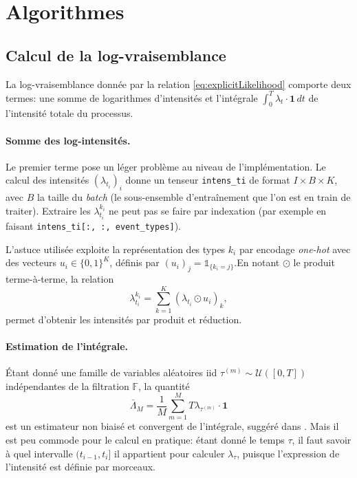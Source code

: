 \documentclass[../main.tex]{subfiles}
\begin{document}
\section{Algorithmes}\label{sec:algoAppendix}

\subsection{Calcul de la log-vraisemblance}

La log-vraisemblance donnée par la relation \eqref{eq:explicitLikelihood} comporte deux termes: une somme de logarithmes d'intensités et l'intégrale $\int_0^T\lambda_t\cdot\mathbf{1}\,dt$ de l'intensité totale du processus.

\paragraph{Somme des log-intensités.} Le premier terme pose un léger problème au niveau de l'implémentation. Le calcul des intensités ${(\lambda_{t_i})}_i$ donne un tenseur \verb|intens_ti| de format $I\times B\times K$, avec $B$ la taille du \textit{batch} (le sous-ensemble d'entraînement que l'on est en train de traiter). Extraire les $\lambda^{k_i}_{t_i}$ ne peut pas se faire par indexation (par exemple en faisant \verb|intens_ti[:, :, event_types]|).

L'astuce utilisée exploite la représentation des types $k_i$ par encodage \textit{one-hot} avec des vecteurs $u_i\in{\{0,1\}}^K$, définis par $(u_i)_j = \mathds{1}_{\{k_i = j\}}$.\footnotemark En notant $\odot$ le produit terme-à-terme, la relation
\[
\lambda^{k_i}_{t_i} = \sum_{k=1}^K {(\lambda_{t_i} \odot u_i)}_k,
\]
permet d'obtenir les intensités par produit et réduction.


\paragraph{Estimation de l'intégrale.} Étant donné une famille de variables aléatoires iid $\tau^{(m)}\sim\mathcal{U}([0,T])$ indépendantes de la filtration $\mathds{F}$, la quantité 
\[
\bar{\Lambda}_M = \frac{1}{M}\sum_{m=1}^{M}T\lambda_{\tau^{(m)}}\cdot\mathbf 1
\]
est un estimateur non biaisé et convergent de l'intégrale, suggéré dans \cite[16]{meiEisnerNeuralHawkes}. Mais il est peu commode pour le calcul en pratique: étant donné le temps $\tau$, il faut savoir à quel intervalle $(t_{i-1}, t_i]$ il appartient pour calculer $\lambda_\tau$, puisque l'expression de l'intensité est définie par morceaux.
\end{document}
